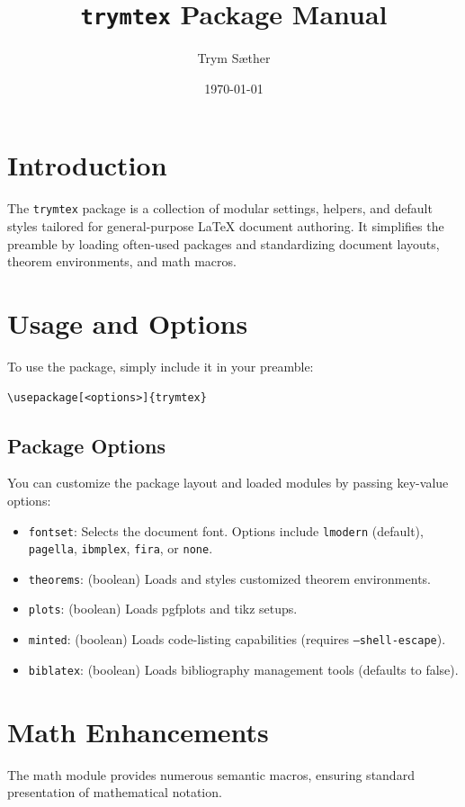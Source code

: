 \documentclass{article}
\title{\texttt{trymtex} Package Manual}
\author{Trym S\ae ther}
\date{\today}
\begin{document}
\maketitle
\tableofcontents
\vspace{1cm}

\section{Introduction}
The \texttt{trymtex} package is a collection of modular settings, helpers, and default styles tailored for general-purpose \LaTeX{} document authoring. It simplifies the preamble by loading often-used packages and standardizing document layouts, theorem environments, and math macros.

\section{Usage and Options}
To use the package, simply include it in your preamble:
\begin{verbatim}
\usepackage[<options>]{trymtex}
\end{verbatim}

\subsection{Package Options}
You can customize the package layout and loaded modules by passing key-value options:
\begin{itemize}
  \item \texttt{fontset}: Selects the document font. Options include \texttt{lmodern} (default), \texttt{pagella}, \texttt{ibmplex}, \texttt{fira}, or \texttt{none}.
  \item \texttt{theorems}: (boolean) Loads and styles customized theorem environments.
  \item \texttt{plots}: (boolean) Loads pgfplots and tikz setups.
  \item \texttt{minted}: (boolean) Loads code-listing capabilities (requires \texttt{--shell-escape}).
  \item \texttt{biblatex}: (boolean) Loads bibliography management tools (defaults to false).
\end{itemize}

\section{Math Enhancements}
The math module provides numerous semantic macros, ensuring standard presentation of mathematical notation.
\end{document}
